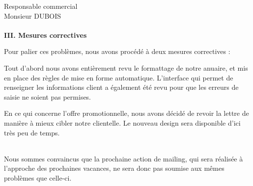 \documentclass[12pt]{lettre}
\begin{document}
\begin{letter}{Responsable commercial\\ Monsieur DUBOIS\\}
\hfill \\    
\textbf{III. Mesures correctives}

Pour palier ces probl\`emes, nous avons proc\'ed\'e \`a deux mesures correctives : 

Tout d'abord nous avons enti\`erement revu le formattage de notre anuaire, et mis en place des r\`egles de mise en forme automatique. L'interface qui permet de renseigner les informations client a \'egalement \'et\'e revu pour que les erreurs de saisie ne soient pas permises.

En ce qui concerne l'offre promotionnelle, nous avons d\'ecid\'e de revoir la lettre de mani\`ere \`a mieux cibler notre clientelle. Le nouveau design sera disponible d'ici tr\`es peu de temps.


\hfill \\

Nous sommes convaincus que la prochaine action de mailing, qui sera r\'ealis\'ee \`a l'approche des prochaines vacances, ne sera donc pas soumise aux m\^{e}mes probl\`emes que celle-ci.
\closing{}
\end{letter}
\end{document}
